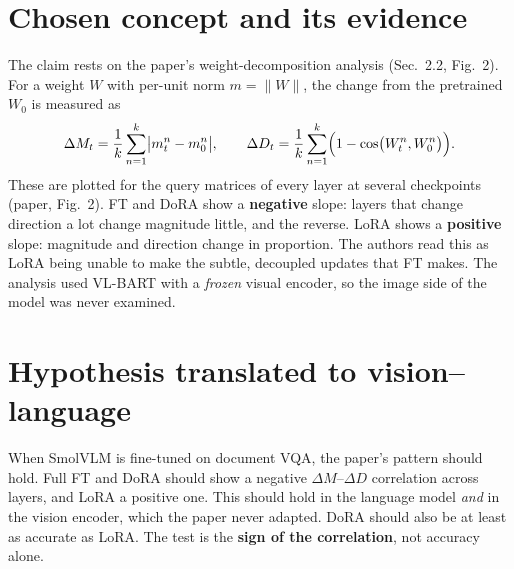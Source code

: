 \documentclass[10pt,a4paper]{article}
\newcommand{\dM}{\Delta M}
\newcommand{\dD}{\Delta D}
\begin{document}
\section{Chosen concept and its evidence}
The claim rests on the paper's weight-decomposition analysis (Sec.~2.2, Fig.~2).
For a weight $W$ with per-unit norm $m=\lVert W\rVert$, the change from the pretrained $W_0$ is measured as
\[
  \dM_t=\frac1k\sum_{n=1}^{k}\bigl|m^n_t-m^n_0\bigr|,\qquad
  \dD_t=\frac1k\sum_{n=1}^{k}\Bigl(1-\cos\bigl(W^n_t,W^n_0\bigr)\Bigr).
\]
These are plotted for the query matrices of every layer at several checkpoints (paper, Fig.~2).
FT and DoRA show a \textbf{negative} slope: layers that change direction a lot change magnitude little, and the reverse.
LoRA shows a \textbf{positive} slope: magnitude and direction change in proportion.
The authors read this as LoRA being unable to make the subtle, decoupled updates that FT makes.
The analysis used VL-BART with a \emph{frozen} visual encoder, so the image side of the model was never examined.

\section{Hypothesis translated to vision--language}
When SmolVLM is fine-tuned on document VQA, the paper's pattern should hold.
Full FT and DoRA should show a negative $\dM$--$\dD$ correlation across layers, and LoRA a positive one.
This should hold in the language model \emph{and} in the vision encoder, which the paper never adapted.
DoRA should also be at least as accurate as LoRA.
The test is the \textbf{sign of the correlation}, not accuracy alone.
\end{document}
